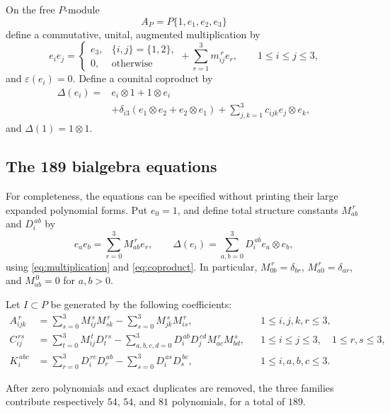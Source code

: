 \documentclass[11pt]{article}
\theoremstyle{remark}
\newcommand{\eps}{\varepsilon}
\begin{document}
On the free \(P\)-module
\[
  A_P=P\{1,e_1,e_2,e_3\}
\]
define a commutative, unital, augmented multiplication by
\begin{equation}\label{eq:multiplication}
 e_i e_j=
 \begin{cases}
   e_3,&\{i,j\}=\{1,2\},\\
   0,&\text{otherwise}
 \end{cases}
 +\sum_{r=1}^3m_{ij}^{\,r}e_r,
 \qquad 1\le i\le j\le3,
\end{equation}
and \(\eps(e_i)=0\).  Define a counital coproduct by
\begin{equation}\label{eq:coproduct}
\begin{split}
 \Delta(e_i)={}&e_i\otimes1+1\otimes e_i\\
 &+\delta_{i3}(e_1\otimes e_2+e_2\otimes e_1)
 +\sum_{j,k=1}^3c_{ijk}e_j\otimes e_k,
\end{split}
\end{equation}
and \(\Delta(1)=1\otimes1\).

\subsection{The 189 bialgebra equations}

For completeness, the equations can be specified without printing their
large expanded polynomial forms.  Put \(e_0=1\), and define total structure
constants \(M_{ab}^{\,r}\) and \(D_i^{\,ab}\) by
\[
 e_a e_b=\sum_{r=0}^3M_{ab}^{\,r}e_r,
 \qquad
 \Delta(e_i)=\sum_{a,b=0}^3D_i^{\,ab}e_a\otimes e_b,
\]
using \eqref{eq:multiplication} and \eqref{eq:coproduct}.  In particular,
\(M_{0b}^{\,r}=\delta_{br}\), \(M_{a0}^{\,r}=\delta_{ar}\), and
\(M_{ab}^{\,0}=0\) for \(a,b>0\).

Let \(I\subset P\) be generated by the following coefficients:
\begin{align}
 A_{ijk}^{\,r}
 &=\sum_{s=0}^3M_{ij}^{\,s}M_{sk}^{\,r}
   -\sum_{s=0}^3M_{jk}^{\,s}M_{is}^{\,r},
 &&1\le i,j,k,r\le3,\label{eq:assoc}\\
 C_{ij}^{\,rs}
 &=\sum_{t=0}^3M_{ij}^{\,t}D_t^{\,rs}
   -\sum_{a,b,c,d=0}^3D_i^{\,ab}D_j^{\,cd}
       M_{ac}^{\,r}M_{bd}^{\,s},
 &&1\le i\le j\le3,\quad1\le r,s\le3,\label{eq:compat}\\
 K_i^{\,abc}
 &=\sum_{r=0}^3D_i^{\,rc}D_r^{\,ab}
   -\sum_{s=0}^3D_i^{\,as}D_s^{\,bc},
 &&1\le i,a,b,c\le3.\label{eq:coassoc}
\end{align}

After zero polynomials and exact duplicates are removed, the three families
contribute respectively \(54\), \(54\), and \(81\) polynomials, for a total
of \(189\).
\end{document}

